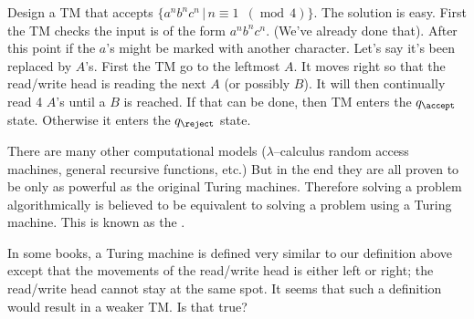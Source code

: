 \begin{eg}
Design a TM that accepts $\{a^nb^nc^n \,|\, n \equiv 1
\,\,\,(\operatorname{mod} \, 4)\}$. The solution is easy. First
the TM checks the input is of the form $a^nb^nc^n$. (We've already
done that). After this point if the $a$'s might be marked with
another character. Let's say it's been replaced by $A$'s. First
the TM go to the leftmost $A$. It moves right so that the
read/write head is reading the next $A$ (or possibly $B$). It will
then continually read 4 $A$'s until a $B$ is reached. If that can
be done, then TM enters the $q_{\accept}$ state. Otherwise it
enters the $q_{\reject}$ state.
\end{eg}


There are many other computational models ($\lambda$--calculus
random access machines, general recursive functions, etc.) But in
the end they are all proven to be only as powerful as the original
Turing machines. Therefore solving a problem algorithmically is
believed to be equivalent to solving a problem using a Turing
machine. This is known as the
.

\begin{eg}
In some books, a Turing machine is defined very similar to our
definition above except that the movements of the read/write head
is either left or right; the read/write head cannot stay at the
same spot. It seems that such a definition would result in a
weaker TM. Is that true?
\end{eg}

